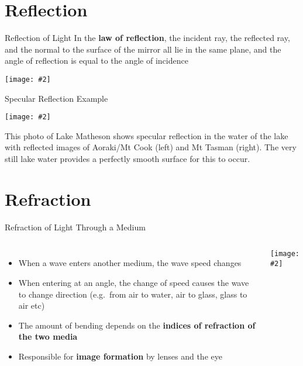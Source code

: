 \documentclass[compress,aspectratio=169]{beamer}
\newcommand{\pic}[2]{\texttt{[image: \#2]}}
\begin{document}
\section{Reflection}

\begin{frame}{Reflection of Light}
  In the \textbf{law of reflection}, the incident ray, the reflected ray, and
  the normal to the surface of the mirror all lie in the same plane, and the
  angle of reflection is equal to the angle of incidence
  \begin{center}
    \pic{.7}{graphics/Types-of-reflection.png}
  \end{center}
\end{frame}


\begin{frame}{Specular Reflection Example}
  \begin{center}
    \pic{.55}{graphics/Lake-reflection.jpg}
  \end{center}
  This photo of Lake Matheson shows specular reflection in the water of the
  lake with reflected images of Aoraki/Mt Cook (left) and Mt Tasman (right).
  The very still lake water provides a perfectly smooth surface for this to
  occur.
\end{frame}



\section{Refraction}

\begin{frame}{Refraction of Light Through a Medium}
  \begin{columns}
    \begin{itemize}
    \item When a wave enters another medium, the wave speed changes
    \item When entering at an angle, the change of speed causes the wave to
      change direction (e.g.\ from air to water, air to glass, glass to air etc)
    \item The amount of bending depends on the
      \textbf{indices of refraction of the two media}
    \item Responsible for \textbf{image formation} by lenses and the eye
    \end{itemize}
    \pic{1}{graphics/negative_refraction.jpg}
  \end{columns}
\end{frame}
\end{document}
